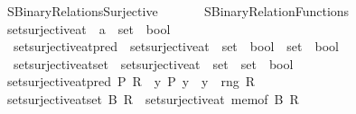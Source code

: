 %
\begin{isabellebody}%
%
%
\isadelimdocument
%
\endisadelimdocument
%
\isatagdocument
%
\isamarkuptrue%
%
\endisatagdocument
{\isafolddocument}%
%
\isadelimdocument
%
\endisadelimdocument
%
\isadelimtheory
%
\endisadelimtheory
%
\isatagtheory
{}\isamarkupfalse%
\ SBinary{\isacharunderscore}{\kern0pt}Relations{\isacharunderscore}{\kern0pt}Surjective\isanewline
\ \ \isanewline
\ \ \ \ SBinary{\isacharunderscore}{\kern0pt}Relation{\isacharunderscore}{\kern0pt}Functions\isanewline
{}%
\endisatagtheory
{\isafoldtheory}%
%
\isadelimtheory
\isanewline
%
\endisadelimtheory
\isanewline
{}\isamarkupfalse%
\ set{\isacharunderscore}{\kern0pt}surjective{\isacharunderscore}{\kern0pt}at\ {\isacharcolon}{\kern0pt}{\isacharcolon}{\kern0pt}\ {\isachardoublequoteopen}{\isacharprime}{\kern0pt}a\ {\isasymRightarrow}\ set\ {\isasymRightarrow}\ bool{\isachardoublequoteclose}\isanewline
\isanewline
{}\isamarkupfalse%
\isanewline
\ \ set{\isacharunderscore}{\kern0pt}surjective{\isacharunderscore}{\kern0pt}at{\isacharunderscore}{\kern0pt}pred\ {\isasymequiv}\ {\isachardoublequoteopen}set{\isacharunderscore}{\kern0pt}surjective{\isacharunderscore}{\kern0pt}at\ {\isacharcolon}{\kern0pt}{\isacharcolon}{\kern0pt}\ {\isacharparenleft}{\kern0pt}set\ {\isasymRightarrow}\ bool{\isacharparenright}{\kern0pt}\ {\isasymRightarrow}\ set\ {\isasymRightarrow}\ bool{\isachardoublequoteclose}\isanewline
\ \ set{\isacharunderscore}{\kern0pt}surjective{\isacharunderscore}{\kern0pt}at{\isacharunderscore}{\kern0pt}set\ {\isasymequiv}\ {\isachardoublequoteopen}set{\isacharunderscore}{\kern0pt}surjective{\isacharunderscore}{\kern0pt}at\ {\isacharcolon}{\kern0pt}{\isacharcolon}{\kern0pt}\ set\ {\isasymRightarrow}\ set\ {\isasymRightarrow}\ bool{\isachardoublequoteclose}\isanewline
{}\isanewline
\ \ \isamarkupfalse%
\ {\isachardoublequoteopen}set{\isacharunderscore}{\kern0pt}surjective{\isacharunderscore}{\kern0pt}at{\isacharunderscore}{\kern0pt}pred\ P\ R\ {\isasymequiv}\ {\isasymforall}y{\isachardot}{\kern0pt}\ P\ y\ {\isasymlongrightarrow}\ y\ {\isasymin}\ rng\ R{\isachardoublequoteclose}\isanewline
\ \ \isamarkupfalse%
\ {\isachardoublequoteopen}set{\isacharunderscore}{\kern0pt}surjective{\isacharunderscore}{\kern0pt}at{\isacharunderscore}{\kern0pt}set\ B\ R\ {\isasymequiv}\ set{\isacharunderscore}{\kern0pt}surjective{\isacharunderscore}{\kern0pt}at\ {\isacharparenleft}{\kern0pt}mem{\isacharunderscore}{\kern0pt}of\ B{\isacharparenright}{\kern0pt}\ R{\isachardoublequoteclose}\isanewline

\end{isabellebody}
